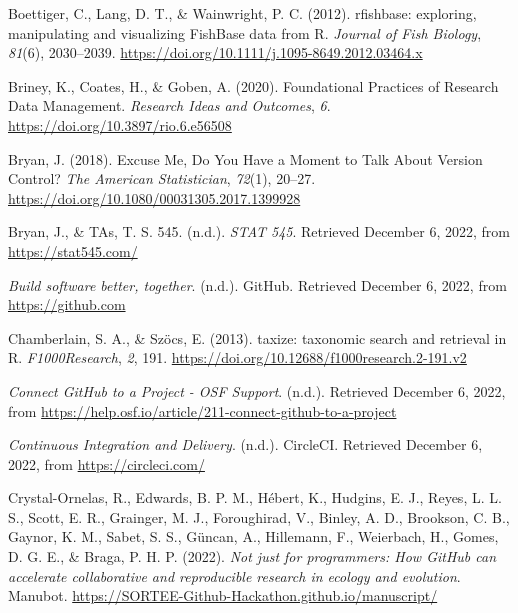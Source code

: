 \begin{CSLReferences}{1}{0}
\leavevmode{}%
Boettiger, C., Lang, D. T., \& Wainwright, P. C. (2012). rfishbase: exploring, manipulating and visualizing FishBase data from R. \emph{Journal of Fish Biology}, \emph{81}(6), 2030--2039. \url{https://doi.org/10.1111/j.1095-8649.2012.03464.x}

\leavevmode{}%
Briney, K., Coates, H., \& Goben, A. (2020). Foundational Practices of Research Data Management. \emph{Research Ideas and Outcomes}, \emph{6}. \url{https://doi.org/10.3897/rio.6.e56508}

\leavevmode{}%
Bryan, J. (2018). Excuse Me, Do You Have a Moment to Talk About Version Control? \emph{The American Statistician}, \emph{72}(1), 20--27. \url{https://doi.org/10.1080/00031305.2017.1399928}

\leavevmode{}%
Bryan, J., \& TAs, T. S. 545. (n.d.). \emph{STAT 545}. Retrieved December 6, 2022, from \url{https://stat545.com/}

\leavevmode{}%
\emph{Build software better, together}. (n.d.). GitHub. Retrieved December 6, 2022, from \url{https://github.com}

\leavevmode{}%
Chamberlain, S. A., \& Szöcs, E. (2013). taxize: taxonomic search and retrieval in R. \emph{F1000Research}, \emph{2}, 191. \url{https://doi.org/10.12688/f1000research.2-191.v2}

\leavevmode{}%
\emph{Connect GitHub to a Project - OSF Support}. (n.d.). Retrieved December 6, 2022, from \url{https://help.osf.io/article/211-connect-github-to-a-project}

\leavevmode{}%
\emph{Continuous Integration and Delivery}. (n.d.). CircleCI. Retrieved December 6, 2022, from \url{https://circleci.com/}

\leavevmode{}%
Crystal-Ornelas, R., Edwards, B. P. M., Hébert, K., Hudgins, E. J., Reyes, L. L. S., Scott, E. R., Grainger, M. J., Foroughirad, V., Binley, A. D., Brookson, C. B., Gaynor, K. M., Sabet, S. S., Güncan, A., Hillemann, F., Weierbach, H., Gomes, D. G. E., \& Braga, P. H. P. (2022). \emph{Not just for programmers: How GitHub can accelerate collaborative and reproducible research in ecology and evolution}. Manubot. \url{https://SORTEE-Github-Hackathon.github.io/manuscript/}


\end{CSLReferences}
